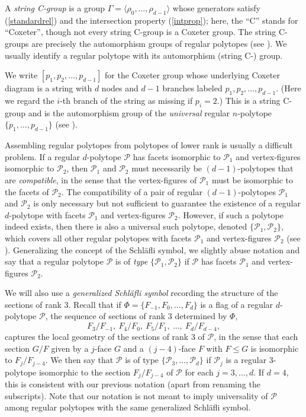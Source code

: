 \documentclass[10pt,a4paper]{amsart}
\theoremstyle{definition}
\begin{document}
A \textit{string C-group\/} is a group $\Gamma = \langle \rho_0,\ldots, \rho_{d-1} \rangle$ whose generators satisfy (\ref{standardrel}) and the intersection property (\ref{intprop}); here, the ``C'' stands for ``Coxeter'', though not every string C-group is a Coxeter group. The string C-groups are precisely the automorphism groups of regular polytopes (see \cite[Ch. 2E]{McMSch2002}). We usually identify a regular polytope with its automorphism (string C-) group.

We write $[p_{1},p_{2},\ldots,p_{d-1}]$ for the Coxeter group whose underlying Coxeter diagram is a string with $d$ nodes and $d-1$ branches labeled $p_{1},p_{2},\ldots,p_{d-1}$. (Here we regard the $i$-th branch of the string as missing if $p_{i}=2$.) This is a string C-group and is the automorphism group of the \textit{universal} regular $n$-polytope $\{p_{1},\ldots,p_{d-1}\}$ (see \cite[Ch. 3D]{McMSch2002}). 

Assembling regular polytopes from polytopes of lower rank is usually a difficult problem. If a regular $d$-polytope $\mathcal{P}$ has facets isomorphic to $\mathcal{P}_1$ and vertex-figures isomorphic to $\mathcal{P}_2$, then $\mathcal{P}_1$ and $\mathcal{P}_2$ must necessarily be $(d-1)$-polytopes that are \textit{compatible}, in the sense that the vertex-figures of $\mathcal{P}_1$ must be isomorphic to the facets of $\mathcal{P}_2$. The compatibility of a pair of regular $(d-1)$-polytopes $\mathcal{P}_1$ and $\mathcal{P}_2$ is only necessary but not sufficient to guarantee the existence of a regular $d$-polytope with facets $\mathcal{P}_1$ and vertex-figures $\mathcal{P}_2$. However, if such a polytope indeed exists, then there is also a universal such polytope, denoted $\{\mathcal{P}_1,\mathcal{P}_2\}$, which covers all other regular polytopes with facets $\mathcal{P}_1$ and vertex-figures $\mathcal{P}_2$ (see \cite[Thm.\,4A2]{McMSch2002}). Generalizing the concept of the Schl\"afli symbol, we slightly abuse notation and say that a regular polytope $\mathcal{P}$ is of \textit{type\/} $\{\mathcal{P}_1,\mathcal{P}_2\}$ if $\mathcal{P}$ has facets $\mathcal{P}_1$ and vertex-figures $\mathcal{P}_2$.

We will also use a \textit{generalized Schl\"afli symbol\/} recording the structure of the sections of rank 3. Recall that if $\Phi=\{F_{-1},F_0,\ldots,F_d\}$ is a flag of a regular $d$-polytope $\mathcal P$, the sequence of sections of rank 3 determined by $\Phi$, 
\begin{equation}
\label{rk3sections}
F_3/F_{-1},\ F_4/F_0,\ F_5/F_1,\ \ldots,\ F_{d}/F_{d-4},
\end{equation}
captures the local geometry of the sections of rank 3 of $\mathcal P$, in the sense that each section $G/F$ given by a $j$-face $G$ and a $(j-4)$-face $F$ with $F\leq G$ is isomorphic to $F_j/F_{j-4}$. We then say that $\mathcal{P}$ is of type $\{\mathcal{P}_3,\ldots,\mathcal{P}_{d}\}$ if $\mathcal{P}_j$ is a regular 3-polytope isomorphic to the section $F_{j}/F_{j-4}$ of $\mathcal{P}$ for each $j=3,\ldots,d$. If $d=4$, this is consistent with our previous notation (apart from renaming the subscripts). Note that our notation is not meant to imply universality of $\mathcal{P}$ among regular polytopes with the same generalized Schl\"afli symbol.
\end{document}
